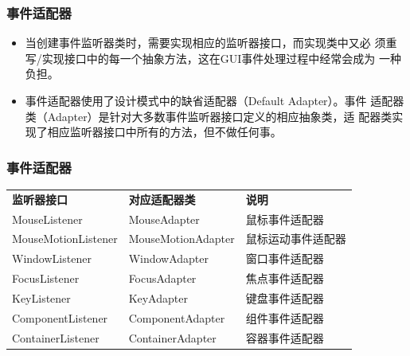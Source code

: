 \begin{frame}[fragile] %
  \frametitle{事件适配器}

  \begin{itemize}[<+-|alert@+>]
  \item 当创建事件监听器类时，需要实现相应的监听器接口，而实现类中又必
    须重写/实现接口中的每一个抽象方法，这在GUI事件处理过程中经常会成为
    一种负担。
  \item 事件适配器使用了设计模式中的缺省适配器（Default Adapter）。事件
    适配器类（Adapter）是针对大多数事件监听器接口定义的相应抽象类，适
    配器类实现了相应监听器接口中所有的方法，但不做任何事。
  \end{itemize}

\end{frame}

\begin{frame}[fragile] %
  \frametitle{事件适配器}

  \begin{table}
    \scriptsize
    \setlength{\extrarowheight}{1.2mm}
    \begin{tabular}{lll}
      {\bf 监听器接口} & {\bf 对应适配器类} & {\bf 说明}\\
      MouseListener & MouseAdapter & 鼠标事件适配器\\
      MouseMotionListener & MouseMotionAdapter & 鼠标运动事件适配器\\
      WindowListener & WindowAdapter & 窗口事件适配器\\
      FocusListener & FocusAdapter & 焦点事件适配器\\
      KeyListener & KeyAdapter & 键盘事件适配器\\
      ComponentListener & ComponentAdapter & 组件事件适配器\\
      ContainerListener & ContainerAdapter & 容器事件适配器\\
    \end{tabular}
  \end{table}
  
\end{frame}


